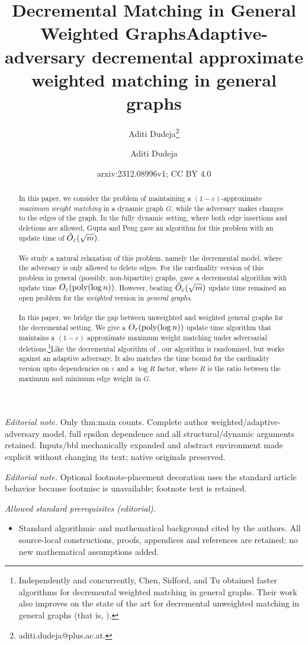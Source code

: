 \documentclass[a4paper,11pt]{article}
\title{Decremental Matching in General Weighted Graphs}
\author{Aditi Dudeja\thanks{aditi.dudeja@plus.ac.at.}}
\affil{Department of Computer Science, University of Salzburg}
\date{}
\title{Adaptive-adversary decremental approximate weighted matching in general graphs}
\author{Aditi Dudeja}
\date{arxiv:2312.08996v1; CC BY 4.0}
\newcommand{\poly}{\mbox{\rm poly}}
\newcommand{\eps}{\varepsilon}
\theoremstyle{definition}
\theoremstyle{definition}
\theoremstyle{definition}
\theoremstyle{definition}
\theoremstyle{definition}
\theoremstyle{definition}
\theoremstyle{definition}
\theoremstyle{definition}
\theoremstyle{definition}
\theoremstyle{definition}
\theoremstyle{definition}
\theoremstyle{definition}
\theoremstyle{definition}
\theoremstyle{definition}
\theoremstyle{definition}
\begin{document}
\maketitle
\noindent\textit{Editorial note.} Only thm:main counts. Complete author weighted/adaptive-adversary model, full epsilon dependence and all structural/dynamic arguments retained. Inputs/bbl mechanically expanded and abstract environment made explicit without changing its text; native originals preserved.\par\medskip
\noindent\textit{Editorial note.} Optional footnote-placement decoration uses the standard article behavior because footmisc is unavailable; footnote text is retained.\par\medskip
\noindent\textit{Allowed standard prerequisites (editorial).}\begin{itemize}
\item Standard algorithmic and mathematical background cited by the authors. All source-local constructions, proofs, appendices and references are retained; no new mathematical assumptions added.
\end{itemize}\medskip

\begin{abstract}In this paper, we consider the problem of maintaining a $(1-\eps)$-approximate \emph{maximum weight matching} in a dynamic graph $G$, while the adversary makes changes to the edges of the graph. In the fully dynamic setting, where both edge insertions and deletions are allowed, Gupta and Peng \cite{GP13} gave an algorithm for this problem with an update time of $\Tilde{O}_{\eps}(\sqrt{m})$. \\ \\ 
We study a natural relaxation of this problem, namely the decremental model, where the adversary is only allowed to delete edges. For the cardinality version of this problem in general (possibly, non-bipartite) graphs, \cite{AssadiBD22} gave a decremental algorithm with update time $O_{\eps}(\poly(\log n))$. However, beating $\Tilde{O}_{\eps}(\sqrt{m})$ update time remained an open problem for the \emph{weighted} version in \emph{general graphs}.\\ \\
In this paper, we bridge the gap between unweighted and weighted general graphs for the decremental setting. We give a $O_{\eps}(\poly(\log n))$ update time algorithm that maintains a $(1-\eps)$ approximate maximum weight matching under adversarial deletions.\footnote{Independently and concurrently, Chen, Sidford, and Tu \cite{ChenST23} obtained faster algorithms for decremental weighted matching in general graphs. Their work also improves on the state of the art for decremental unweighted matching in general graphs (that is, \cite{AssadiBD22}).}Like the decremental algorithm of \cite{AssadiBD22}, our algorithm is randomized, but works against an adaptive adversary. It also matches the time bound for the cardinality version upto dependencies on $\eps$ and a $\log R$ factor, where $R$ is the ratio between the maximum and minimum edge weight in $G$. \end{abstract}
\end{document}
